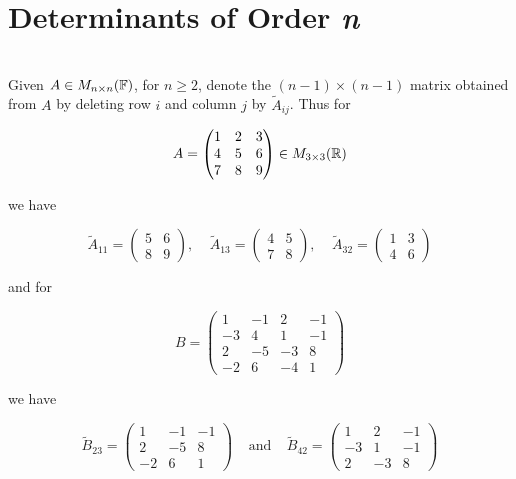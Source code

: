 \section{Determinants of Order \textit{n}}

\begin{notation}
	\hfill\\
	Given $A \in M_{n \times n}(\mathbb{F})$, for $n \geq 2$, denote the $(n-1) \times (n - 1)$ matrix obtained from $A$ by deleting row $i$ and column $j$ by $\tilde{A}_{ij}$. Thus for

	\[A = \begin{pmatrix}
			1 & 2 & 3 \\
			4 & 5 & 6 \\
			7 & 8 & 9
		\end{pmatrix} \in M_{3 \times 3}(\mathbb{R})\]

	we have

	\[\tilde{A}_{11} = \begin{pmatrix}
			5 & 6 \\
			8 & 9
		\end{pmatrix},\ \ \ \ \
		\tilde{A}_{13}=\begin{pmatrix}
			4 & 5 \\
			7 & 8
		\end{pmatrix},\ \ \ \ \
		\tilde{A}_{32} = \begin{pmatrix}
			1 & 3 \\
			4 & 6
		\end{pmatrix}\]

	and for

	\[B = \begin{pmatrix}
			1  & -1 & 2  & -1 \\
			-3 & 4  & 1  & -1 \\
			2  & -5 & -3 & 8  \\
			-2 & 6  & -4 & 1
		\end{pmatrix}\]

	we have

	\[\tilde{B}_{23} = \begin{pmatrix}
			1  & -1 & -1 \\
			2  & -5 & 8  \\
			-2 & 6  & 1
		\end{pmatrix}\ \ \ \ \ \text{and}\ \ \ \ \ \tilde{B}_{42}=\begin{pmatrix}
			1  & 2  & -1 \\
			-3 & 1  & -1 \\
			2  & -3 & 8
		\end{pmatrix}\]
\end{notation}

